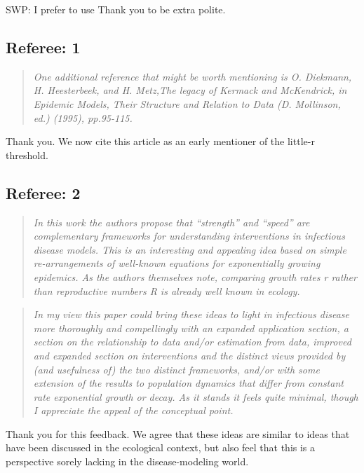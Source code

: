 SWP: I prefer to use Thank you to be extra polite.

\hypertarget{referee-1}{%
\subsection{Referee: 1}\label{referee-1}}

\begin{quote}\sl
One additional reference that might be worth mentioning is O. Diekmann,
H. Heesterbeek, and H. Metz,The legacy of Kermack and McKendrick, in
Epidemic Models, Their Structure and Relation to Data (D. Mollinson,
ed.) (1995), pp.95-115.
\end{quote}

Thank you. We now cite this article as an early mentioner of the
little-r threshold.

\hypertarget{referee-2}{%
\subsection{Referee: 2}\label{referee-2}}

\begin{quote}\sl
In this work the authors propose that ``strength'' and ``speed'' are
complementary frameworks for understanding interventions in infectious
disease models. This is an interesting and appealing idea based on
simple re-arrangements of well-known equations for exponentially growing
epidemics. As the authors themselves note, comparing growth rates r
rather than reproductive numbers R is already well known in ecology.
\end{quote}

\begin{quote}\sl
In my view this paper could bring these ideas to light in infectious
disease more thoroughly and compellingly with an expanded application
section, a section on the relationship to data and/or estimation from
data, improved and expanded section on interventions and the distinct
views provided by (and usefulness of) the two distinct frameworks,
and/or with some extension of the results to population dynamics that
differ from constant rate exponential growth or decay. As it stands it
feels quite minimal, though I appreciate the appeal of the conceptual
point.
\end{quote}

Thank you for this feedback. We agree that these ideas are similar to
ideas that have been discussed in the ecological context, but also feel
that this is a perspective sorely lacking in the disease-modeling world.

